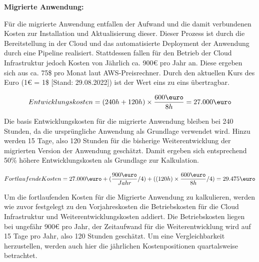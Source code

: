 


\textbf{Migrierte Anwendung:}

Für die migrierte Anwendung entfallen der Aufwand und die damit verbundenen Kosten zur Installation und Aktualisierung dieser. Dieser Prozess ist durch die Bereitstellung in der Cloud und das automatisierte Deployment der Anwendung durch eine Pipeline realisiert. Stattdessen fallen für den Betrieb der Cloud Infrastruktur jedoch Kosten von Jährlich ca. 900€ pro Jahr an. Diese ergeben sich aus ca. 75\$ pro Monat laut \ac{AWS}-Preisrechner. Durch den aktuellen Kurs des Euro (1€ = 1\$ [Stand: 29.08.2022]) ist der Wert eins zu eins übertragbar.

\begin{align}
    Entwicklungskosten = (240h + 120h) \times \frac{600\mbox{\euro}}{8h} = 27.000\mbox{\euro}
\end{align}

Die basis Entwicklungskosten für die migrierte Anwendung bleiben bei 240 Stunden, da die ursprüngliche Anwendung als Grundlage verwendet wird. Hinzu werden 15 Tage, also 120 Stunden für die bisherige Weiterentwicklung der migrierten Version der Anwendung
geschätzt. Damit ergeben sich entsprechend 50\% höhere Entwicklungskosten als Grundlage zur Kalkulation.

\begin{align}
    Fortlaufende Kosten = 27.000\mbox{\euro} + (\frac{900\mbox{\euro}}{Jahr}/4) + ((120h) \times \frac{600\mbox{\euro}}{8h}/4) = 29.475\mbox{\euro}
\end{align}

Um die fortlaufenden Kosten für die Migrierte Anwendung zu kalkulieren, werden wie zuvor festgelegt zu den Vorjahreskosten die Betriebskosten für die Cloud Infrastruktur und Weiterentwicklungskosten addiert. Die Betriebskosten liegen bei ungefähr 900€ pro Jahr, der Zeitaufwand für die Weiterentwicklung wird auf 15 Tage pro Jahr, also 120 Stunden geschätzt. Um eine Vergleichbarkeit herzustellen, werden auch hier die jährlichen Kostenpositionen quartalsweise betrachtet.

